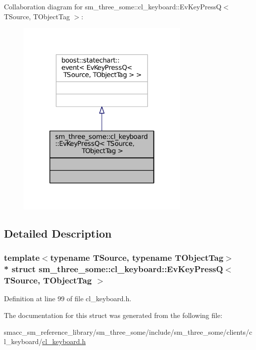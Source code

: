 Collaboration diagram for sm\+\_\+three\+\_\+some\+:\+:cl\+\_\+keyboard\+:\+:Ev\+Key\+PressQ$<$ T\+Source, T\+Object\+Tag $>$\+:
\nopagebreak
\begin{figure}[H]
\begin{center}
\leavevmode
\includegraphics[width=238pt]{structsm__three__some_1_1cl__keyboard_1_1EvKeyPressQ__coll__graph}
\end{center}
\end{figure}


\subsection{Detailed Description}
\subsubsection*{template$<$typename T\+Source, typename T\+Object\+Tag$>$\\*
struct sm\+\_\+three\+\_\+some\+::cl\+\_\+keyboard\+::\+Ev\+Key\+Press\+Q$<$ T\+Source, T\+Object\+Tag $>$}



Definition at line 99 of file cl\+\_\+keyboard.\+h.



The documentation for this struct was generated from the following file\+:\begin{DoxyCompactItemize}
\item 
smacc\+\_\+sm\+\_\+reference\+\_\+library/sm\+\_\+three\+\_\+some/include/sm\+\_\+three\+\_\+some/clients/cl\+\_\+keyboard/\hyperlink{cl__keyboard_8h}{cl\+\_\+keyboard.\+h}\end{DoxyCompactItemize}
